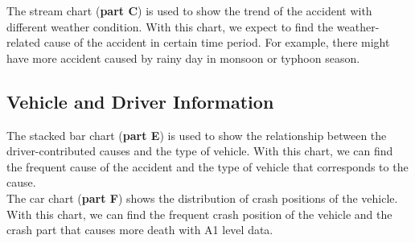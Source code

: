 \documentclass[a4paper, oneside, final, 12pt]{scrartcl} %
\begin{document}
The stream chart (\textbf{part C}) is used to show the trend of the accident with different weather condition.
With this chart, we expect to find the weather-related cause of the accident in certain time period.
For example, there might have more accident caused by rainy day in monsoon or typhoon season.

\subsection{Vehicle and Driver Information}

The stacked bar chart (\textbf{part E}) is used to show the relationship between the driver-contributed causes
and the type of vehicle. With this chart, we can find the frequent cause of the accident
and the type of vehicle that corresponds to the cause. \\

The car chart (\textbf{part F}) shows the distribution of crash positions of the vehicle.
With this chart, we can find the frequent crash position of the vehicle
and the crash part that causes more death with A1 level data.



\endgroup

\end{document}
